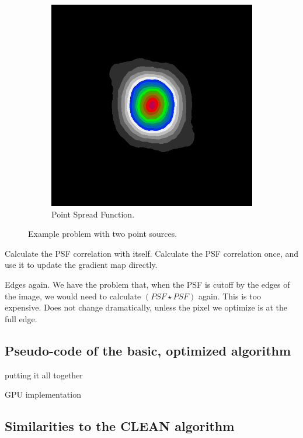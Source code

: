 \begin{figure}[h]
\begin{subfigure}[b]{0.3\linewidth}
		\includegraphics[width=\linewidth]{./chapters/03.distribution/simulated/psf2.png}
		\caption{Point Spread Function.}
		\label{cd:efficient:update:psf}
	\end{subfigure}
	\caption{Example problem with two point sources.}
	\label{cd:efficient:update:figure}
\end{figure}

Calculate the PSF correlation with itself. Calculate the PSF correlation once, and use it to update the gradient map directly.

Edges again. We have the problem that, when the PSF is cutoff by the edges of the image, we would need to calculate $(PSF \star PSF)$ again. This is too expensive. Does not change dramatically, unless the pixel we optimize is at the full edge.



\subsection{Pseudo-code of the basic, optimized algorithm}

putting it all together




GPU implementation

\subsection{Similarities to the CLEAN algorithm}

